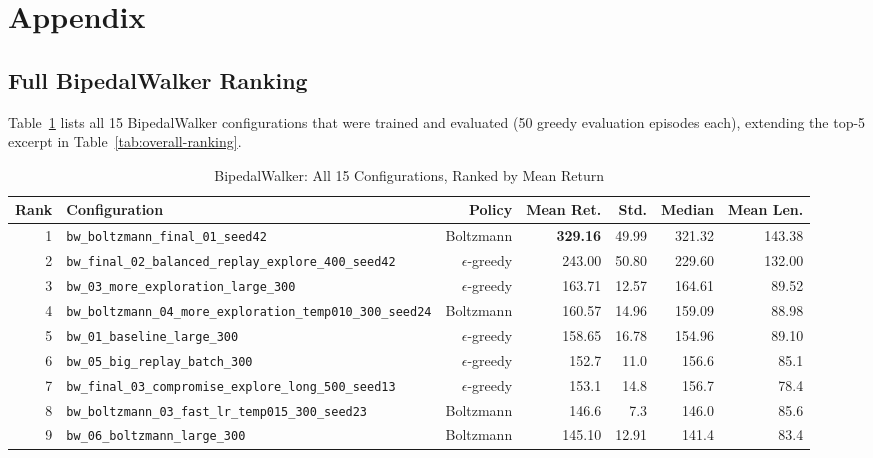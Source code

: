 \section{Appendix}

\subsection{Full BipedalWalker Ranking}

Table~\ref{tab:bw-full-ranking} lists all 15 BipedalWalker configurations that were trained and evaluated (50 greedy evaluation episodes each), extending the top-5 excerpt in Table~\ref{tab:overall-ranking}.

\begin{table}[h]
    \centering
    \footnotesize
    \caption{BipedalWalker: All 15 Configurations, Ranked by Mean Return}
    \label{tab:bw-full-ranking}
    \begin{tabular}{rlrrrrr}
        \toprule
        Rank & Configuration & Policy & Mean Ret. & Std. & Median & Mean Len. \\
        \midrule
        1  & \texttt{bw\_boltzmann\_final\_01\_seed42}                        & Boltzmann      & \textbf{329.16} & 49.99 & 321.32 & 143.38 \\
        2  & \texttt{bw\_final\_02\_balanced\_replay\_explore\_400\_seed42}   & $\epsilon$-greedy & 243.00 & 50.80 & 229.60 & 132.00 \\
        3  & \texttt{bw\_03\_more\_exploration\_large\_300}                   & $\epsilon$-greedy & 163.71 & 12.57 & 164.61 & 89.52 \\
        4  & \texttt{bw\_boltzmann\_04\_more\_exploration\_temp010\_300\_seed24} & Boltzmann   & 160.57 & 14.96 & 159.09 & 88.98 \\
        5  & \texttt{bw\_01\_baseline\_large\_300}                            & $\epsilon$-greedy & 158.65 & 16.78 & 154.96 & 89.10 \\
        6  & \texttt{bw\_05\_big\_replay\_batch\_300}                         & $\epsilon$-greedy & 152.7  & 11.0  & 156.6  & 85.1 \\
        7  & \texttt{bw\_final\_03\_compromise\_explore\_long\_500\_seed13}   & $\epsilon$-greedy & 153.1  & 14.8  & 156.7  & 78.4 \\
        8  & \texttt{bw\_boltzmann\_03\_fast\_lr\_temp015\_300\_seed23}       & Boltzmann      & 146.6  & 7.3   & 146.0  & 85.6 \\
        9  & \texttt{bw\_06\_boltzmann\_large\_300}                           & Boltzmann      & 145.10 & 12.91 & 141.4  & 83.4 \\

\end{tabular}
\end{table}
